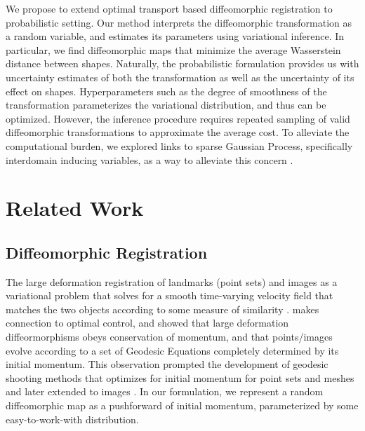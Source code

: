 \documentclass{6838publ}
\begin{document}
We propose to extend optimal transport based diffeomorphic registration to probabilistic setting. Our method interprets the diffeomorphic transformation as a random variable, and estimates its parameters using variational inference. In particular, we find diffeomorphic maps that minimize the average Wasserstein distance between shapes. Naturally, the probabilistic formulation provides us with uncertainty estimates of both the transformation as well as the uncertainty of its effect on shapes. Hyperparameters such as the degree of smoothness of the transformation parameterizes the variational distribution, and thus can be optimized. However, the inference procedure requires repeated sampling of valid diffeomorphic transformations to approximate the average cost. To alleviate the computational burden, we explored links to sparse Gaussian Process, specifically interdomain inducing variables, as a way to alleviate this concern \cite{figueiras-vidalInterdomainGaussianProcesses2009a}.


\section{Related Work}

\subsection{Diffeomorphic Registration}

The large deformation registration of landmarks (point sets) and images as a variational problem that solves for a smooth time-varying velocity field that matches the two objects according to some measure of similarity \cite{joshiLandmarkMatchingLarge2000,begComputingLargeDeformation2005}. \cite{millerGeodesicShootingComputational2006,vialardDiffeomorphic3DImage2012} makes connection to optimal control, and showed that large deformation diffeormorphisms obeys conservation of momentum, and that points/images evolve according to a set of Geodesic Equations completely determined by its initial momentum. This observation prompted the development of geodesic shooting methods that optimizes for initial momentum for point sets and meshes \cite{vaillantStatisticsDiffeomorphismsTangent2004,allassonniereGeodesicShootingDiffeomorphic2005} and later extended to images \cite{vialardDiffeomorphic3DImage2012}. In our formulation, we represent a random diffeomorphic map as a pushforward of initial momentum, parameterized by some easy-to-work-with distribution.
\end{document}
